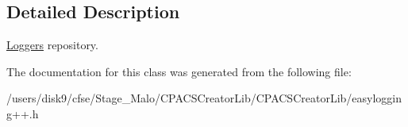 \subsection{Detailed Description}
\hyperlink{classel_1_1Loggers}{Loggers} repository. 

The documentation for this class was generated from the following file\-:\begin{DoxyCompactItemize}
\item 
/users/disk9/cfse/\-Stage\-\_\-\-Malo/\-C\-P\-A\-C\-S\-Creator\-Lib/\-C\-P\-A\-C\-S\-Creator\-Lib/easylogging++.\-h\end{DoxyCompactItemize}
